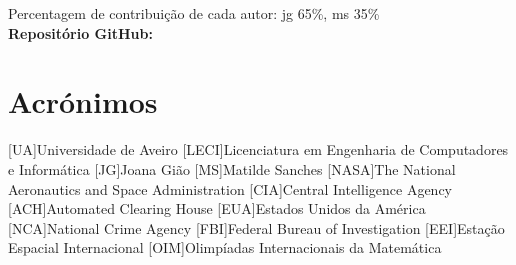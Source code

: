\documentclass{report}
\begin{document}
\vspace{10pt}
Percentagem de contribuição de cada autor: \ac{jg} 65\%, \ac{ms} 35\%\\

\vspace{10pt}
\textbf{Repositório GitHub:} \repo

\chapter*{Acrónimos}
\begin{acronym}
[UA]{Universidade de Aveiro}
[LECI]{Licenciatura em Engenharia de Computadores e Informática}
[JG]{Joana Gião}
[MS]{Matilde Sanches}
[NASA]{The National Aeronautics and Space Administration}
[CIA]{Central Intelligence Agency}
[ACH]{Automated Clearing House}
[EUA]{Estados Unidos da América}
[NCA]{National Crime Agency}
[FBI]{Federal Bureau of Investigation}
[EEI]{Estação Espacial Internacional}
[OIM]{Olimpíadas Internacionais da Matemática}
\end{acronym}
\printbibliography
\end{document}
